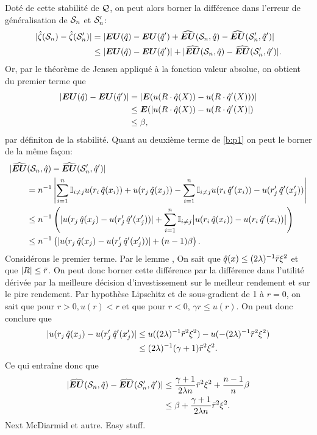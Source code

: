 Doté de cette stabilité de $\alg$, on peut alors borner la différence dans l'erreur de
généralisation de $\S_n$ et $\S_n'$:
\begin{align}
  |\hat\zeta(\S_n) - \hat\zeta(\S_n')| &= |\EU(\hat q) - \EU(\hat q') + \hEU(\S_n,\hat q) - \hEU(\S_n',\hat q')|\\
                       &\leq |\EU(\hat q) - \EU(\hat q')| + |\hEU(\S_n,\hat q) -
                         \hEU(\S_n',\hat q')|. \label{b:p1}                         
\end{align}
Or, par le théorème de Jensen appliqué à la fonction valeur absolue, on obtient du premier
terme que
\begin{align}
  |\EU(\hat q) - \EU(\hat q')| &= |\E(u(R \cdot \hat q(X)) - u(R \cdot \hat q'(X)))|\\
                                       & \leq \E(|u(R\cdot \hat q(X)) - u(R \cdot \hat q'(X)|)\\
                                       & \leq \beta,
\end{align}
par définiton de la stabilité. Quant au deuxième terme de \eqref{b:p1} on peut le borner
de la même façon:
\begin{align}
  &|\hEU(\S_n,\hat q) - \hEU(\S_n',\hat q')|\\
  &\qquad = n^{-1}\left|\sumi \mathbb{I}_{i\neq j}u(r_i\,\hat q(x_i)) + u(r_j\,\hat q(x_j)) - \sumi
    \mathbb{I}_{i\neq j}u(r_i\,\hat q'(x_i)) - u(r_j'\,\hat q'(x_j'))\right|\\
  &\qquad \leq n^{-1}\left(| u(r_j\,\hat q(x_j) - u(r_j'\,\hat q'(x_j'))| +\sumi \mathbb{I}_{i\neq
    j}\big|u(r_i\,\hat q(x_i)) - u(r_i\,\hat q'(x_i))\big|\right)\\
  &\qquad \leq n^{-1}\left(| u(r_j\,\hat q(x_j) - u(r_j'\,\hat q'(x_j'))| + (n-1)\beta\right).
\end{align}
Considérons le premier terme. Par le lemme \todo{}, On sait que
$\hat q(x) \leq (2\lambda)^{-1}\rmax\xi^2$ et que $|R|\leq\rmax$. On peut donc borner cette différence
par la différence dans l'utilité dérivée par la meilleure décision d'investissement sur le
meilleur rendement et sur le pire rendement. Par hypothèse Lipschitz et de sous-gradient
de 1 à $r=0$, on sait que pour $r>0, u(r)<r$ et que pour $r<0$, $\gamma r \leq u(r)$. On peut donc
conclure que 
\begin{align}
  |u(r_j\,\hat q(x_j) - u(r_j'\,\hat q'(x_j')| &\leq u((2\lambda)^{-1}\rmax^2\xi^2) -
                                                 u(-(2\lambda)^{-1}\rmax^2\xi^2)\\
  & \leq (2\lambda)^{-1}(\gamma+1)\rmax^2\xi^2.
\end{align}
Ce qui entraîne donc que
\begin{align}
  |\hEU(\S_n,\hat q) - \hEU(\S_n',\hat q')| &\leq \frac{\gamma+1}{2\lambda n}\rmax^2\xi^2 +
                                              \frac{n-1}{n}\beta\\
                                            &\leq \beta + \frac{\gamma+1}{2\lambda n}\rmax^2\xi^2.
\end{align}
Next McDiarmid et autre. Easy stuff.

